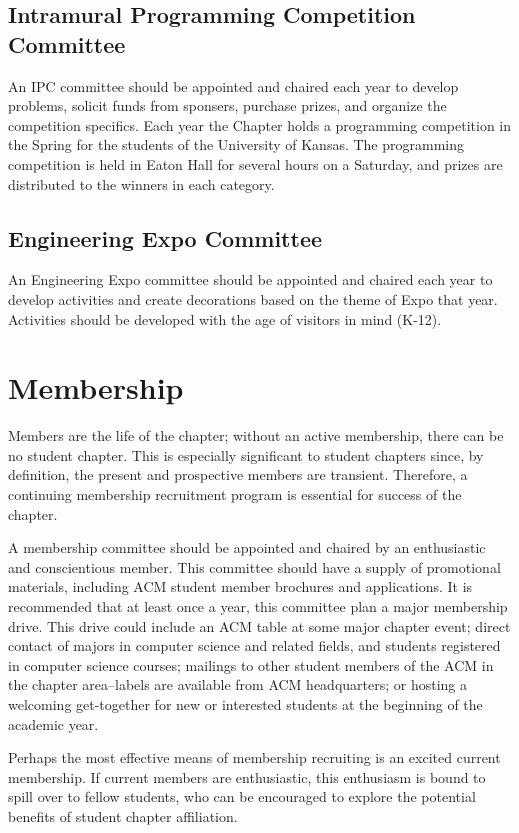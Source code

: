 \subsection*{Intramural Programming Competition Committee}
An IPC committee should be appointed and chaired each year to develop problems, solicit funds from sponsers, purchase prizes, and organize the competition specifics. Each year the Chapter holds a programming competition in the Spring for the students of the University of Kansas. The programming competition is held in Eaton Hall for several hours on a Saturday, and prizes are distributed to the winners in each category.
\subsection*{Engineering Expo Committee}
An Engineering Expo committee should be appointed and chaired each year to develop activities and create decorations based on the theme of Expo that year. Activities should be developed with the age of visitors in mind (K-12).

\section{Membership}

Members are the life of the chapter; without an active membership, there can be no student chapter. This is especially significant to student chapters since, by definition, the present and prospective members are transient. Therefore, a continuing membership recruitment program is essential for success of the chapter.

A membership committee should be appointed and chaired by an enthusiastic and conscientious member. This committee should have a supply of promotional materials, including ACM student member brochures and applications. It is recommended that at least once a year, this committee plan a major membership drive. This drive could include an ACM table at some major chapter event; direct contact of majors in computer science and related fields, and students registered in computer science courses; mailings to other student members of the ACM in the chapter area--labels are available from ACM headquarters; or hosting a welcoming get-together for new or interested students at the beginning of the academic year.

Perhaps the most effective means of membership recruiting is an excited current membership. If current members are enthusiastic, this enthusiasm is bound to spill over to fellow students, who can be encouraged to explore the potential benefits of student chapter affiliation.

